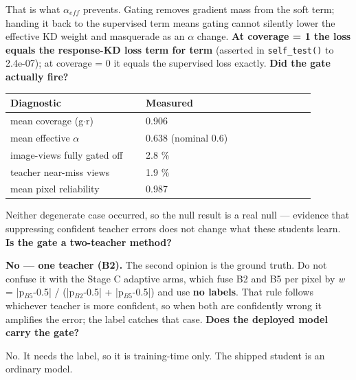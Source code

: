 \documentclass[10pt,a4paper]{article}
\newcommand{\qq}[1]{\medskip\noindent\textbf{\color{navy}#1}\par\nobreak}
\begin{document}
That is what $\alpha$$_{eff}$ prevents. Gating removes gradient mass from the soft term; handing it back to the supervised term means gating cannot silently lower the effective KD weight and masquerade as an $\alpha$ change. \textbf{At coverage = 1 the loss equals the response-KD loss term for term} (asserted in \texttt{self_test()} to 2.4e-07); at coverage = 0 it equals the supervised loss exactly.
\qq{Did the gate actually fire?}
\begin{center}\small\begin{tabular}{p{0.4\linewidth}p{0.5\linewidth}}
\toprule
\textbf{Diagnostic} & \textbf{Measured} \\
\midrule
mean coverage (g$\cdot$r) & 0.906 \\
mean effective $\alpha$ & 0.638  (nominal 0.6) \\
image-views fully gated off & 2.8 \% \\
teacher near-miss views & 1.9 \% \\
mean pixel reliability & 0.987 \\
\bottomrule\end{tabular}\end{center}
Neither degenerate case occurred, so the null result is a real null — evidence that suppressing confident teacher errors does not change what these students learn.
\qq{Is the gate a two-teacher method?}
\textbf{No — one teacher (B2).} The second opinion is the ground truth. Do not confuse it with the Stage C adaptive arms, which fuse B2 and B5 per pixel by \textit{w} = |p$_{B5}$-0.5| / (|p$_{B2}$-0.5| + |p$_{B5}$-0.5|) and use \textbf{no labels}. That rule follows whichever teacher is more confident, so when both are confidently wrong it amplifies the error; the label catches that case.
\qq{Does the deployed model carry the gate?}
No. It needs the label, so it is training-time only. The shipped student is an ordinary model.
\end{document}
